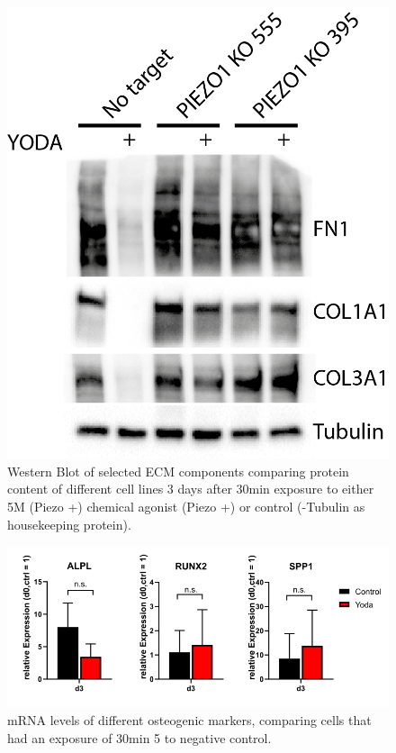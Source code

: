 \begin{figure}
	\centering
	\includegraphics[width=0.7\linewidth]{Uli_Blot_KO.png}
	\caption{Western Blot of selected ECM components comparing protein content of different cell lines 3 days after 30min exposure to either 5\textmu{}M (Piezo +) chemical \Piezo{} agonist (Piezo +) or control  (\textalpha{}-Tubulin as housekeeping protein).}
	\label{pic:UliBlot}
\end{figure}


\begin{figure}[htbp]
\centering
\includegraphics[width = \linewidth]{Osteogenic_PCR_Yoda.png}
\caption{mRNA levels of different osteogenic markers, comparing cells that had an exposure of 30min 5\textmu{} to negative control.}
\end{figure}

